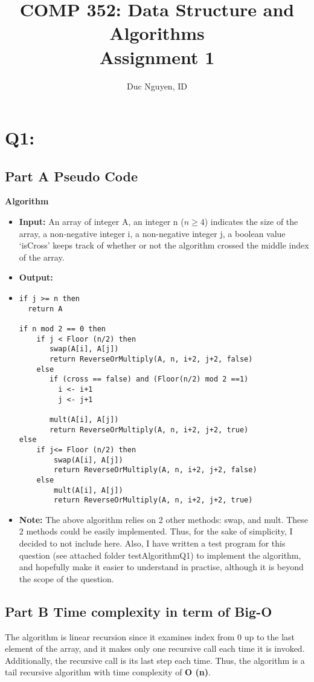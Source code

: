 \documentclass{article}
\title{COMP 352: Data Structure and Algorithms
	\\ Assignment 1}
\author{Duc Nguyen, ID\: 40064649}
\date{}
\begin{document}
\maketitle
\section*{Q1:}%

\subsection*{Part A\: Pseudo Code}
\textbf{Algorithm } 
\begin{itemize}
	\item[]\textbf{Input: } An array of integer A, an integer n ($n\geq4$) indicates the size of the array, a non-negative integer i, a non-negative integer j, a boolean value `isCross' keeps track of whether or not the algorithm crossed the middle index of the array.
	\item[]\textbf{Output: } 
\item[]\begin{verbatim}
if j >= n then 
  return A

if n mod 2 == 0 then
    if j < Floor (n/2) then 
       swap(A[i], A[j])
       return ReverseOrMultiply(A, n, i+2, j+2, false)
    else 
       if (cross == false) and (Floor(n/2) mod 2 ==1) 
         i <- i+1
         j <- j+1

       mult(A[i], A[j])
       return ReverseOrMultiply(A, n, i+2, j+2, true)
else 
    if j<= Floor (n/2) then
        swap(A[i], A[j])
        return ReverseOrMultiply(A, n, i+2, j+2, false)
    else
        mult(A[i], A[j])
        return ReverseOrMultiply(A, n, i+2, j+2, true)

\end{verbatim}
\item[] \textbf{Note: } The above algorithm relies on 2 other methods: swap, and mult. These 2 methods could be easily 
	implemented. Thus, for the sake of simplicity, I decided to not include here. 
	Also, I have written a test program for this question (see attached folder testAlgorithmQ1) to implement the algorithm, and hopefully make it easier to understand in practise, although it is beyond the scope of the question.
\end{itemize}

\subsection*{Part B\: Time complexity in term of Big-O}
The algorithm is linear recursion since it examines index from 0 up to the last element of the array, and it makes only one recursive call each time it is invoked. Additionally, the recursive call is its last step each time. Thus, the algorithm is a tail recursive algorithm with time complexity of \textbf{O (n)}.
\end{document}
